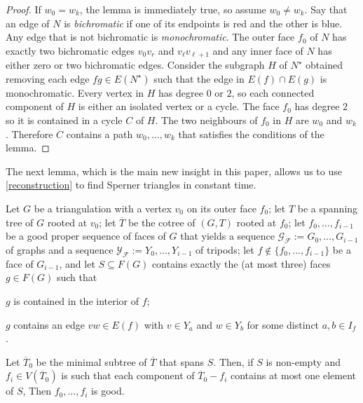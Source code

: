 \documentclass{patmorin}
\begin{document}
\begin{proof}
  If $w_0=w_k$, the lemma is immediately true, so assume $w_0\neq w_k$.
  Say that an edge of $N$ is \emph{bichromatic} if one of its endpoints is red and the other is blue.  Any edge that is not bichromatic is \emph{monochromatic}.  The outer face $f_0$ of $N$ has exactly two bichromatic edges $v_0v_r$ and $v_{\ell}v_{\ell+1}$ and any inner face of $N$ has either zero or two bichromatic edges.  Consider the subgraph $H$ of $N^\star$ obtained removing each edge $fg\in E(N^\star)$ such that the edge in $E(f)\cap E(g)$ is monochromatic.  Every vertex in $H$ has degree $0$ or $2$, so each connected component of $H$ is either an isolated vertex or a cycle.  The face $f_0$ has degree $2$ so it is contained in a cycle $C$ of $H$.  The two neighbours of $f_0$ in $H$ are $w_0$ and $w_k$. Therefore $C$ contains a path $w_0,\ldots,w_k$ that satisfies the conditions of the lemma.
\end{proof}

The next lemma, which is the main new insight in this paper, allows us to use \cref{reconstruction} to find Sperner triangles in constant time.

\begin{lem}\label{lca_sperner}
  Let $G$ be a triangulation with a vertex $v_0$ on its outer face $f_0$; let $T$ be a spanning tree of $G$ rooted at $v_0$; let $\overline{T}$ be the cotree of $(G,T)$ rooted at $f_0$; let $f_0,\ldots,f_{i-1}$ be a good proper sequence of faces of $G$ that yields a sequence $\mathcal{G_F}:=G_0,\ldots,G_{i-1}$ of graphs and a sequence $\mathcal{Y_F}:=Y_0,\ldots,Y_{i-1}$ of tripods; let $f\not\in \{f_0,\ldots,f_{i-1}\}$ be a face of $G_{i-1}$, and let $S\subseteq F(G)$ contains exactly the (at most three) faces $g\in F(G)$ such that
  \begin{compactenum}[(i)]
      \item $g$ is contained in the interior of $f$;
      \item $g$ contains an edge $vw\in E(f)$ with $v\in Y_a$ and $w\in Y_b$ for some distinct $a,b\in I_f$.
  \end{compactenum}
  Let $\overline{T}_0$ be the minimal subtree of $\overline{T}$ that spans $S$.  Then, if $S$ is non-empty and $f_i\in V(\overline{T}_0)$ is such that each component of $\overline{T}_0-f_i$ contains at most one element of $S$,
  Then $f_0,\ldots,f_i$ is good.
\end{lem}
\end{document}
